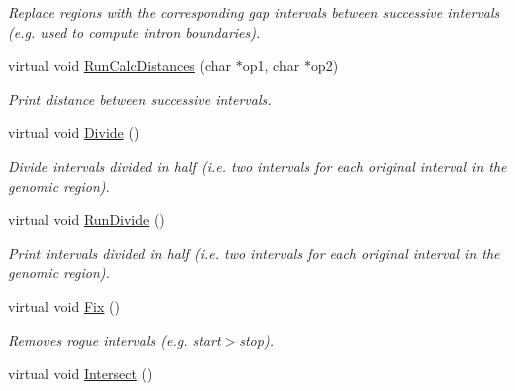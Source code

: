 \begin{CompactItemize}
\begin{CompactList}\small\item\em Replace regions with the corresponding gap intervals between successive intervals (e.g. used to compute intron boundaries). \item\end{CompactList}\item 
\hypertarget{classGenomicRegion_98695d5d1056d693a1c635b197f4b8bf}{
virtual void \hyperlink{classGenomicRegion_98695d5d1056d693a1c635b197f4b8bf}{RunCalcDistances} (char $\ast$op1, char $\ast$op2)}
\label{classGenomicRegion_98695d5d1056d693a1c635b197f4b8bf}

\begin{CompactList}\small\item\em Print distance between successive intervals. \item\end{CompactList}\item 
\hypertarget{classGenomicRegion_0785438db56d7b7cc7539470e85434dd}{
virtual void \hyperlink{classGenomicRegion_0785438db56d7b7cc7539470e85434dd}{Divide} ()}
\label{classGenomicRegion_0785438db56d7b7cc7539470e85434dd}

\begin{CompactList}\small\item\em Divide intervals divided in half (i.e. two intervals for each original interval in the genomic region). \item\end{CompactList}\item 
\hypertarget{classGenomicRegion_45fe5d619f2e21644eacb6984aa47eff}{
virtual void \hyperlink{classGenomicRegion_45fe5d619f2e21644eacb6984aa47eff}{RunDivide} ()}
\label{classGenomicRegion_45fe5d619f2e21644eacb6984aa47eff}

\begin{CompactList}\small\item\em Print intervals divided in half (i.e. two intervals for each original interval in the genomic region). \item\end{CompactList}\item 
\hypertarget{classGenomicRegion_048d2182b212789b182c2c82a7ac131e}{
virtual void \hyperlink{classGenomicRegion_048d2182b212789b182c2c82a7ac131e}{Fix} ()}
\label{classGenomicRegion_048d2182b212789b182c2c82a7ac131e}

\begin{CompactList}\small\item\em Removes rogue intervals (e.g. start$>$stop). \item\end{CompactList}\item 
\hypertarget{classGenomicRegion_8075e77ab6296b59506857cc21ee4c9d}{
virtual void \hyperlink{classGenomicRegion_8075e77ab6296b59506857cc21ee4c9d}{Intersect} ()}
\label{classGenomicRegion_8075e77ab6296b59506857cc21ee4c9d}


\end{CompactItemize}
